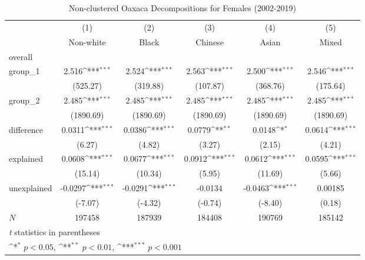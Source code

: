 \begin{table}[htbp]\centering
\def\sym#1{\ifmmode^{#1}\else\(^{#1}\)\fi}
\caption{Non-clustered Oaxaca Decompositions for Females (2002-2019)\label{tab1}}
\begin{tabular}{l*{5}{c}}
\hline\hline
            &\multicolumn{1}{c}{(1)}&\multicolumn{1}{c}{(2)}&\multicolumn{1}{c}{(3)}&\multicolumn{1}{c}{(4)}&\multicolumn{1}{c}{(5)}\\
            &\multicolumn{1}{c}{Non-white}&\multicolumn{1}{c}{Black}&\multicolumn{1}{c}{Chinese}&\multicolumn{1}{c}{Asian}&\multicolumn{1}{c}{Mixed}\\
\hline
overall     &                     &                     &                     &                     &                     \\
group\_1     &       2.516\sym{***}&       2.524\sym{***}&       2.563\sym{***}&       2.500\sym{***}&       2.546\sym{***}\\
            &    (525.27)         &    (319.88)         &    (107.87)         &    (368.76)         &    (175.64)         \\
group\_2     &       2.485\sym{***}&       2.485\sym{***}&       2.485\sym{***}&       2.485\sym{***}&       2.485\sym{***}\\
            &   (1890.69)         &   (1890.69)         &   (1890.69)         &   (1890.69)         &   (1890.69)         \\
difference  &      0.0311\sym{***}&      0.0386\sym{***}&      0.0779\sym{**} &      0.0148\sym{*}  &      0.0614\sym{***}\\
            &      (6.27)         &      (4.82)         &      (3.27)         &      (2.15)         &      (4.21)         \\
explained   &      0.0608\sym{***}&      0.0677\sym{***}&      0.0912\sym{***}&      0.0612\sym{***}&      0.0595\sym{***}\\
            &     (15.14)         &     (10.34)         &      (5.95)         &     (11.69)         &      (5.66)         \\
unexplained &     -0.0297\sym{***}&     -0.0291\sym{***}&     -0.0134         &     -0.0463\sym{***}&     0.00185         \\
            &     (-7.07)         &     (-4.32)         &     (-0.74)         &     (-8.40)         &      (0.18)         \\
\hline
\(N\)       &      197458         &      187939         &      184408         &      190769         &      185142         \\
\hline\hline
\multicolumn{6}{l}{\footnotesize \textit{t} statistics in parentheses}\\
\multicolumn{6}{l}{\footnotesize \sym{*} \(p<0.05\), \sym{**} \(p<0.01\), \sym{***} \(p<0.001\)}\\
\end{tabular}
\label{tab:oaxaca_female_nonclustered}
\end{table}
